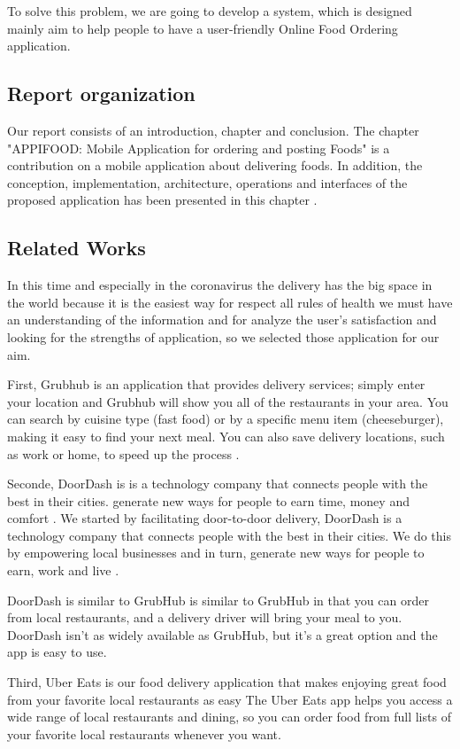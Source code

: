 To solve this problem, we are going to develop a system, which is designed mainly aim to help people to have a user-friendly Online Food Ordering  application.
\newpage
\subsection{Report organization}
Our report consists of an introduction, chapter  and   conclusion.
The chapter "APPIFOOD: Mobile Application for ordering and posting Foods" is a contribution on a mobile application about delivering foods. In addition,  the conception, implementation, architecture, operations and interfaces  of the proposed application  has been presented in this chapter . 

\subsection{Related Works}
In this time and especially in the coronavirus the delivery has the big space in the world because it is the easiest way for respect all rules of  health we must have an understanding of the information and for analyze the user’s satisfaction and looking for the strengths of application, so we selected those application for our aim. 

First, Grubhub  is an application that provides delivery services; simply enter your location and Grubhub will show you all of the restaurants in your area. You can search by cuisine type (fast food) or by a specific menu item (cheeseburger), making it easy to find your next meal. You can also save delivery locations, such as work or home, to speed up the process \cite{1}.

Seconde, DoorDash is is a technology company that connects people with the best in their cities. generate new ways for people to earn time, money and comfort . We started by facilitating door-to-door delivery, DoorDash is a technology company that connects people with the best in their cities. We do this by empowering local businesses and in turn, generate new ways for people to earn, work and live \cite{2}.

DoorDash is similar to GrubHub is similar to GrubHub in that you can order from local restaurants, and a delivery driver will bring your meal to you. DoorDash isn’t as widely available as GrubHub, but it’s a great option and the app is easy to use.

Third, Uber Eats is our food delivery application that makes enjoying great food from your favorite local restaurants as easy
The Uber Eats app helps you access a wide range of local restaurants and dining, so you can order food from full lists of your favorite local restaurants whenever you want\cite{3}.

\begin{small}

\end{small}